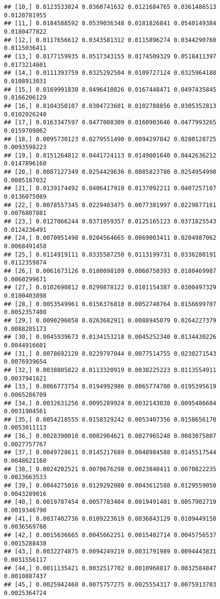 \documentclass[]{article}
\begin{document}
\begin{verbatim}
## [10,] 0.0123533024 0.0360741632 0.0121684765 0.0361486513 0.0120781955
## [11,] 0.0184588592 0.0539036348 0.0181826841 0.0540149384 0.0180477822
## [12,] 0.0117656612 0.0343581312 0.0115896274 0.0344290760 0.0115036411
## [13,] 0.0177159935 0.0517343155 0.0174509329 0.0518411397 0.0173214601
## [14,] 0.0111393759 0.0325292504 0.0109727124 0.0325964188 0.0108913031
## [15,] 0.0169991830 0.0496410826 0.0167448471 0.0497435845 0.0166206129
## [16,] 0.0104350107 0.0304723601 0.0102788856 0.0305352813 0.0102026240
## [17,] 0.0163347597 0.0477008309 0.0160903646 0.0477993265 0.0159709862
## [18,] 0.0095730123 0.0279551490 0.0094297842 0.0280128725 0.0093598223
## [19,] 0.0151264812 0.0441724113 0.0149001640 0.0442636212 0.0147896160
## [20,] 0.0087127349 0.0254429636 0.0085823780 0.0254954998 0.0085187032
## [21,] 0.0139174492 0.0406417910 0.0137092211 0.0407257107 0.0136075089
## [22,] 0.0078557345 0.0229403475 0.0077381997 0.0229877161 0.0076807881
## [23,] 0.0127066244 0.0371059357 0.0125165123 0.0371825543 0.0124236491
## [24,] 0.0070051498 0.0204564665 0.0069003411 0.0204987062 0.0068491458
## [25,] 0.0114919111 0.0335587250 0.0113199731 0.0336280191 0.0112359874
## [26,] 0.0061673126 0.0180098109 0.0060750393 0.0180469987 0.0060299671
## [27,] 0.0102690812 0.0299878122 0.0101154387 0.0300497329 0.0100403898
## [28,] 0.0053549961 0.0156376810 0.0052748764 0.0156699707 0.0052357408
## [29,] 0.0090296058 0.0263682911 0.0088945079 0.0264227379 0.0088285173
## [30,] 0.0045939673 0.0134153218 0.0045252340 0.0134430226 0.0044916601
## [31,] 0.0078692120 0.0229797044 0.0077514755 0.0230271543 0.0076939654
## [32,] 0.0038805822 0.0113320919 0.0038225223 0.0113554911 0.0037941621
## [33,] 0.0066773754 0.0194992986 0.0065774708 0.0195395619 0.0065286709
## [34,] 0.0032631256 0.0095289924 0.0032143038 0.0095486684 0.0031904561
## [35,] 0.0054218555 0.0158329242 0.0053407356 0.0158656170 0.0053011113
## [36,] 0.0028390010 0.0082904621 0.0027965248 0.0083075807 0.0027757767
## [37,] 0.0049728611 0.0145217689 0.0048984588 0.0145517544 0.0048621160
## [38,] 0.0024202521 0.0070676298 0.0023840411 0.0070822235 0.0023663533
## [39,] 0.0044275016 0.0129292080 0.0043612588 0.0129559050 0.0043289016
## [40,] 0.0019787454 0.0057783404 0.0019491401 0.0057902719 0.0019346790
## [41,] 0.0037402736 0.0109223619 0.0036843129 0.0109449150 0.0036569780
## [42,] 0.0015636665 0.0045662251 0.0015402714 0.0045756537 0.0015288438
## [43,] 0.0032274875 0.0094249219 0.0031791989 0.0094443831 0.0031556117
## [44,] 0.0011135421 0.0032517702 0.0010968817 0.0032584847 0.0010887437
## [45,] 0.0025942460 0.0075757275 0.0025554317 0.0075913703 0.0025364724

\end{verbatim}
\end{document}
